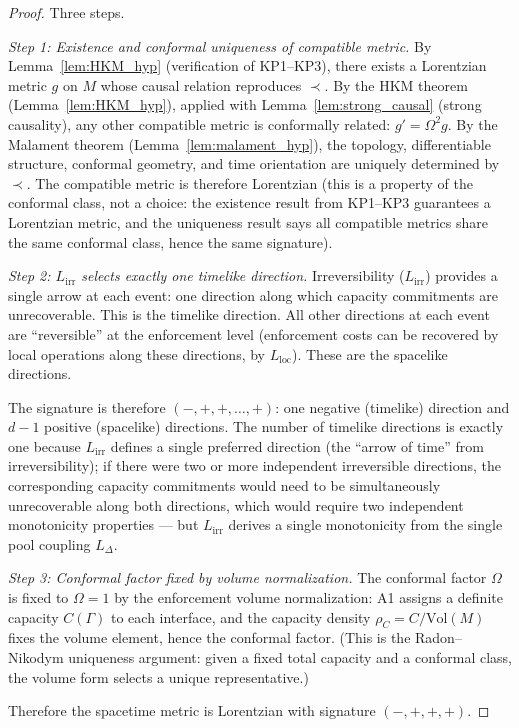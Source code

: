 \documentclass[11pt,a4paper]{article}
\theoremstyle{definition}
\begin{document}
\begin{proof}
Three steps.

\textit{Step 1: Existence and conformal uniqueness of compatible
metric.}\quad
By Lemma~\ref{lem:HKM_hyp} (verification of KP1--KP3), there exists
a Lorentzian metric $g$ on $M$ whose causal relation reproduces
$\prec$.  By the HKM theorem (Lemma~\ref{lem:HKM_hyp}), applied with
Lemma~\ref{lem:strong_causal} (strong causality), any other compatible
metric is conformally related: $g' = \Omega^2 g$.  By the Malament
theorem (Lemma~\ref{lem:malament_hyp}), the topology, differentiable
structure, conformal geometry, and time orientation are uniquely
determined by $\prec$.  The compatible metric is therefore Lorentzian
(this is a property of the conformal class, not a choice: the
existence result from KP1--KP3 guarantees a Lorentzian metric, and
the uniqueness result says all compatible metrics share the same
conformal class, hence the same signature).

\textit{Step 2: $L_{\mathrm{irr}}$ selects exactly one timelike
direction.}\quad
Irreversibility ($L_{\mathrm{irr}}$) provides a single arrow at each
event: one direction along which capacity commitments are unrecoverable.
This is the timelike direction.  All other directions at each event are
``reversible'' at the enforcement level (enforcement costs can be recovered
by local operations along these directions, by $L_{\mathrm{loc}}$).
These are the spacelike directions.

The signature is therefore $(-, +, +, \ldots, +)$: one negative
(timelike) direction and $d-1$ positive (spacelike) directions.  The
number of timelike directions is exactly one because $L_{\mathrm{irr}}$
defines a single preferred direction (the ``arrow of time'' from
irreversibility); if there were two or more independent irreversible
directions, the corresponding capacity commitments would need to be
simultaneously unrecoverable along both directions, which would
require two independent monotonicity properties --- but
$L_{\mathrm{irr}}$ derives a single monotonicity from the single pool
coupling $L_\Delta$.

\textit{Step 3: Conformal factor fixed by volume normalization.}\quad
The conformal factor $\Omega$ is fixed to $\Omega = 1$ by the
enforcement volume normalization: A1 assigns a definite capacity
$C(\Gamma)$ to each interface, and the capacity density
$\rho_C = C / \mathrm{Vol}(M)$ fixes the volume element, hence the
conformal factor.  (This is the Radon--Nikodym uniqueness argument:
given a fixed total capacity and a conformal class, the volume form
selects a unique representative.)

Therefore the spacetime metric is Lorentzian with signature $(-,+,+,+)$.
\end{proof}
\end{document}
